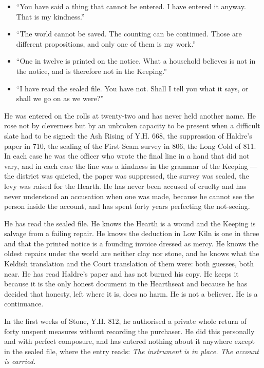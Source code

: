 \documentclass{design/chronicle}
\begin{document}
{\begin{itemize}[leftmargin=1.4em,itemsep=1pt,topsep=3pt,parsep=0pt]
\item “You have said a thing that cannot be entered. I have entered it anyway. That is my kindness.”

\item “The world cannot be saved. The counting can be continued. Those are different propositions, and only one of them is my work.”

\item “One in twelve is printed on the notice. What a household believes is not in the notice, and is therefore not in the Keeping.”

\item “I have read the sealed file. You have not. Shall I tell you what it says, or shall we go on as we were?”

\end{itemize}

He was entered on the rolls at twenty-two and has never held another name. He rose not by cleverness but by an unbroken capacity to be present when a difficult slate had to be signed: the Ash Rising of Y.H. 668, the suppression of Haldre’s paper in 710, the sealing of the First Seam survey in 806, the Long Cold of 811. In each case he was the officer who wrote the final line in a hand that did not vary, and in each case the line was a kindness in the grammar of the Keeping — the district was quieted, the paper was suppressed, the survey was sealed, the levy was raised for the Hearth. He has never been accused of cruelty and has never understood an accusation when one was made, because he cannot see the person inside the account, and has spent forty years perfecting the not-seeing.

He has read the sealed file. He knows the Hearth is a wound and the Keeping is salvage from a failing repair. He knows the deduction in Low Kiln is one in three and that the printed notice is a founding invoice dressed as mercy. He knows the oldest repairs under the world are neither clay nor stone, and he knows what the Keldish translation and the Court translation of them were: both guesses, both near. He has read Haldre’s paper and has not burned his copy. He keeps it because it is the only honest document in the Hearthseat and because he has decided that honesty, left where it is, does no harm. He is not a believer. He is a continuance.

In the first weeks of Stone, Y.H. 812, he authorised a private whole return of forty unspent measures without recording the purchaser. He did this personally and with perfect composure, and has entered nothing about it anywhere except in the sealed file, where the entry reads: \emph{The instrument is in place. The account is carried.}

}
\end{document}
